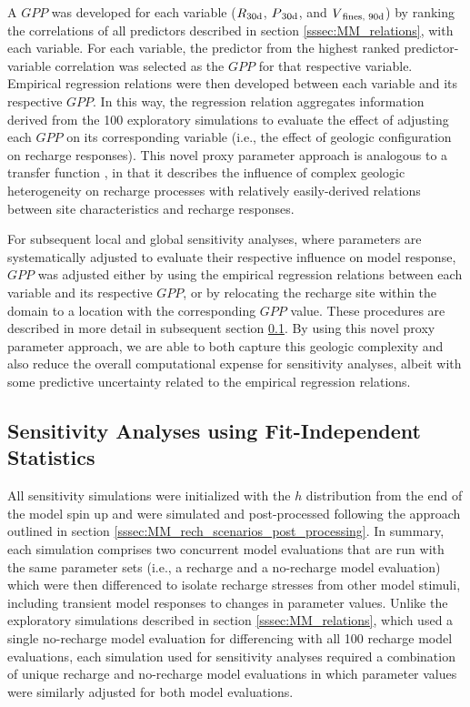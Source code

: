 A $GPP$ was developed for each variable ($R\textsubscript{30d}$, $P\textsubscript{30d}$, and $V\textsubscript{fines, 90d}$) by ranking the correlations of all predictors described in section \ref{sssec:MM_relations}, with each variable. For each variable, the predictor from the highest ranked predictor-variable correlation was selected as the $GPP$ for that respective variable. Empirical regression relations were then developed between each variable and its respective $GPP$. In this way, the regression relation aggregates information derived from the 100 exploratory simulations to evaluate the effect of adjusting each $GPP$ on its corresponding variable (i.e., the effect of geologic configuration on recharge responses). This novel proxy parameter approach is analogous to a transfer function \citep[e.g.,][]{wosten2001pedotransfer}, in that it describes the influence of complex geologic heterogeneity on recharge processes with relatively easily-derived relations between site characteristics and recharge responses.

For subsequent local and global sensitivity analyses, where parameters are systematically adjusted to evaluate their respective influence on model response, $GPP$ was adjusted either by using the empirical regression relations between each variable and its respective $GPP$, or by relocating the recharge site within the domain to a location with the corresponding $GPP$ value. These procedures are described in more detail in subsequent section \ref{ssec:MM_sensitivty}. By using this novel proxy parameter approach, we are able to both capture this geologic complexity and also reduce the overall computational expense for sensitivity analyses, albeit with some predictive uncertainty related to the empirical regression relations.

\subsection{Sensitivity Analyses using Fit-Independent Statistics} \label{ssec:MM_sensitivty}

All sensitivity simulations were initialized with the $h$ distribution from the end of the model spin up and were simulated and post-processed following the approach outlined in section \ref{sssec:MM_rech_scenarios_post_processing}. In summary, each simulation comprises two concurrent model evaluations that are run with the same parameter sets (i.e., a recharge and a no-recharge model evaluation) which were then differenced to isolate recharge stresses from other model stimuli, including transient model responses to changes in parameter values. Unlike the exploratory simulations described in section \ref{sssec:MM_relations}, which used a single no-recharge model evaluation for differencing with all 100 recharge model evaluations, each simulation used for sensitivity analyses required a combination of unique recharge and no-recharge model evaluations in which parameter values were similarly adjusted for both model evaluations.   

